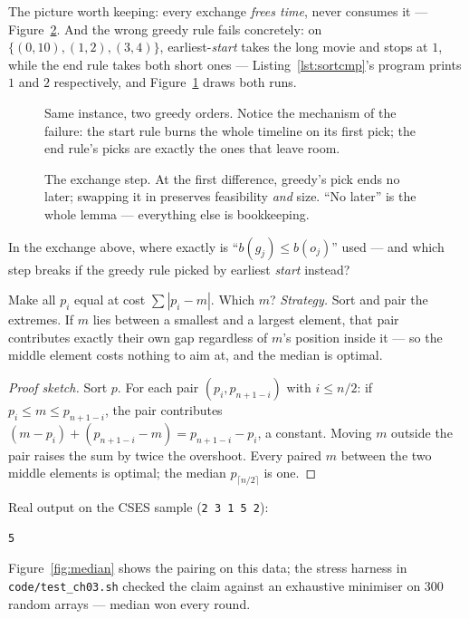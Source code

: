 The picture worth keeping: every exchange \emph{frees time}, never
consumes it --- Figure~\ref{fig:exchange}. And the wrong greedy rule
fails concretely: on $\{(0,10),(1,2),(3,4)\}$, earliest-\emph{start}
takes the long movie and stops at $1$, while the end rule takes both
short ones --- Listing~\ref{lst:sortcmp}'s program prints $1$ and $2$
respectively, and Figure~\ref{fig:timeline} draws both runs.

\begin{figure}[ht]\centering

\caption{Same instance, two greedy orders. Notice the mechanism of the
failure: the start rule burns the whole timeline on its first pick; the
end rule's picks are exactly the ones that leave room.}
\label{fig:timeline}
\end{figure}

\begin{figure}[ht]\centering

\caption{The exchange step. At the first difference, greedy's pick ends
no later; swapping it in preserves feasibility \emph{and} size. ``No
later'' is the whole lemma --- everything else is bookkeeping.}
\label{fig:exchange}
\end{figure}

\begin{exercise}[medium]
In the exchange above, where exactly is
``$b(g_j) \le b(o_j)$'' used --- and which step breaks if the greedy rule
picked by earliest \emph{start} instead?
\end{exercise}

\begin{example}
\label{ex:sticks}
Make all $p_i$ equal at cost $\sum |p_i - m|$. Which $m$?
\emph{Strategy.} Sort and pair the extremes. If $m$ lies between a
smallest and a largest element, that pair contributes exactly their own
gap regardless of $m$'s position inside it --- so the middle element
costs nothing to aim at, and the median is optimal.
\begin{proof}[Proof sketch]
Sort $p$. For each pair $(p_i, p_{n+1-i})$ with $i \le n/2$: if
$p_i \le m \le p_{n+1-i}$, the pair contributes
$(m - p_i) + (p_{n+1-i} - m) = p_{n+1-i} - p_i$, a constant. Moving $m$
outside the pair raises the sum by twice the overshoot. Every paired $m$
between the two middle elements is optimal; the median
$p_{\lceil n/2 \rceil}$ is one.
\end{proof}
\end{example}

Real output on the CSES sample (\texttt{2 3 1 5 2}):
\begin{lstlisting}[numbers=none]
5
\end{lstlisting}
Figure~\ref{fig:median} shows the pairing on this data; the stress
harness in \texttt{code/test\_ch03.sh} checked the claim against an
exhaustive minimiser on 300 random arrays --- median won every round.

